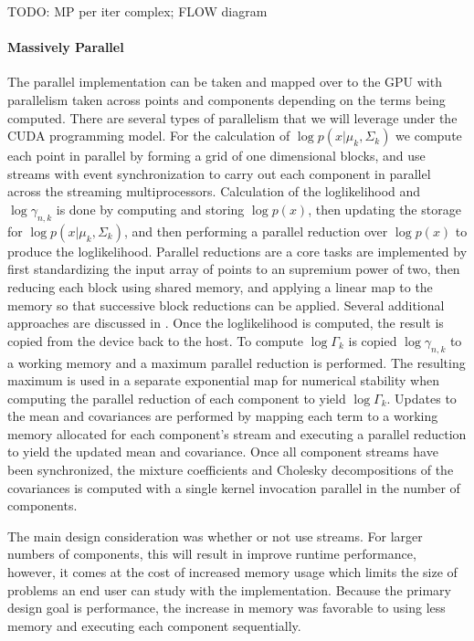 \documentclass{article}
\begin{document}
TODO: MP per iter complex; FLOW diagram

\paragraph{Massively Parallel} The parallel implementation can be taken and mapped over to the GPU with parallelism taken across points and components depending on the terms being computed. There are several types of parallelism that we will leverage under the CUDA programming model. For the calculation of $\log p\left(x | \mu_k, \Sigma_k \right)$ we compute each point in parallel by forming a grid of one dimensional blocks, and use streams with event synchronization to carry out each component in parallel across the streaming multiprocessors. Calculation of the loglikelihood and $\log \gamma_{n,k}$ is done by computing and storing $\log p(x)$, then updating the storage for $\log p\left(x|\mu_k,\Sigma_k\right)$, and then performing a parallel reduction over $\log p(x)$ to produce the loglikelihood. Parallel reductions are a core tasks are implemented by first standardizing the input array of points to an supremium power of two, then reducing each block using shared memory, and applying a linear map to the memory so that successive block reductions can be applied. Several additional approaches are discussed in \cite{harris2007optimizing}. Once the loglikelihood is computed, the result is copied from the device back to the host. To compute $\log \Gamma_k$ is copied $\log \gamma_{n,k}$ to a working memory and a maximum parallel reduction is performed. The resulting maximum is used in a separate exponential map for numerical stability when computing the parallel reduction of each component to yield $\log \Gamma_k$. Updates to the mean and covariances are performed by mapping each term to a working memory allocated for each component's stream and executing a parallel reduction to yield the updated mean and covariance. Once all component streams have been synchronized, the mixture coefficients and Cholesky decompositions of the covariances is computed with a single kernel invocation parallel in the number of components.

The main design consideration was whether or not use streams. For larger numbers of components, this will result in improve runtime performance, however, it comes at the cost of increased memory usage which limits the size of problems an end user can study with the implementation. Because the primary design goal is performance, the increase in memory was favorable to using less memory and executing each component sequentially.
\end{document}

